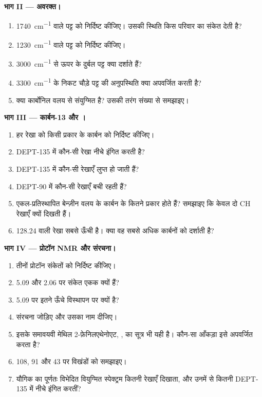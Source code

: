 \begin{problem}
\medskip
\noindent\textbf{भाग II --- अवरक्त।}
\begin{enumerate}[resume]
  \item \qty{1740}{cm^{-1}} वाले पट्ट को निर्दिष्ट कीजिए। उसकी स्थिति किस परिवार का संकेत देती है?
  \item \qty{1230}{cm^{-1}} वाले पट्ट को निर्दिष्ट कीजिए।
  \item \qty{3000}{cm^{-1}} से ऊपर के दुर्बल पट्ट क्या दर्शाते हैं?
  \item \qty{3300}{cm^{-1}} के निकट चौड़े पट्ट की अनुपस्थिति क्या अपवर्जित करती है?
  \item क्या कार्बोनिल वलय से संयुग्मित है? उसकी तरंग संख्या से समझाइए।
\end{enumerate}

\medskip
\noindent\textbf{भाग III --- कार्बन-13 और ।}
\begin{enumerate}[resume]
  \item हर रेखा को किसी प्रकार के कार्बन को निर्दिष्ट कीजिए।
  \item DEPT-135 में कौन-सी रेखा नीचे इंगित करती है?
  \item DEPT-135 में कौन-सी रेखाएँ लुप्त हो जाती हैं?
  \item DEPT-90 में कौन-सी रेखाएँ बची रहती हैं?
  \item एकल-प्रतिस्थापित बेन्ज़ीन वलय के कार्बन के कितने प्रकार होते हैं? समझाइए कि केवल दो 
        CH रेखाएँ क्यों दिखती हैं।
  \item 128.24 वाली रेखा सबसे ऊँची है। क्या वह सबसे अधिक कार्बनों को दर्शाती है?
\end{enumerate}

\medskip
\noindent\textbf{भाग IV --- प्रोटॉन NMR और संरचना।}
\begin{enumerate}[resume]
  \item तीनों प्रोटॉन संकेतों को निर्दिष्ट कीजिए।
  \item 5.09 और 2.06 पर संकेत एकक क्यों हैं?
  \item 5.09 पर  इतने ऊँचे विस्थापन पर क्यों है?
  \item संरचना जोड़िए और उसका नाम दीजिए।
  \item इसके समावयवी मेथिल 2-फ़ेनिलएथेनोएट, , का सूत्र भी यही है। कौन-सा आँकड़ा इसे
        अपवर्जित करता है?
  \item 108, 91 और 43 पर विखंडों को समझाइए।
  \item यौगिक का पूर्णतः विभेदित वियुग्मित  स्पेक्ट्रम कितनी रेखाएँ दिखाता, और
        उनमें से कितनी DEPT-135 में नीचे इंगित करतीं?
\end{enumerate}
\end{problem}
